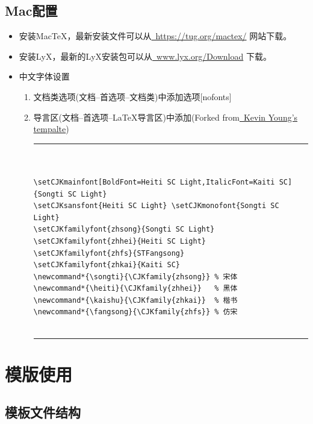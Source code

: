 \documentclass[twoside,longtitle]{LZUthesis}
\begin{document}
\section{Mac配置}
\begin{itemize}
\item 安装Mac\TeX{}，最新安装文件可以从\href{https://tug.org/mactex/}{~https://tug.org/mactex/}
网站下载。
\item 安装LyX，最新的LyX安装包可以从\href{http://www.lyx.org/Download}{~www.lyx.org/Download} 下载。
\item 中文字体设置

\begin{enumerate}
\item 文档类选项(文档--首选项--文档类)中添加选项{[}nofonts{]}
\item 导言区(文档--首选项--\LaTeX{}导言区)中添加(Forked from\href{https://bitbucket.org/kevinyounglzu/latextemplateoflzuthesis}{~Kevin Young's tempalte})


\tiny
\begin{center}
\hrule


\begin{verbatim}


\setCJKmainfont[BoldFont=Heiti SC Light,ItalicFont=Kaiti SC]   {Songti SC Light}
\setCJKsansfont{Heiti SC Light} \setCJKmonofont{Songti SC Light}
\setCJKfamilyfont{zhsong}{Songti SC Light}
\setCJKfamilyfont{zhhei}{Heiti SC Light}
\setCJKfamilyfont{zhfs}{STFangsong}
\setCJKfamilyfont{zhkai}{Kaiti SC}
\newcommand*{\songti}{\CJKfamily{zhsong}} % 宋体
\newcommand*{\heiti}{\CJKfamily{zhhei}}   % 黑体
\newcommand*{\kaishu}{\CJKfamily{zhkai}}  % 楷书
\newcommand*{\fangsong}{\CJKfamily{zhfs}} % 仿宋


\end{verbatim}


\hrule
\end{center}
\normalsize

\end{enumerate}
\end{itemize}




\chapter{模版使用}


\section{模板文件结构\label{sec:files}}
\end{document}
